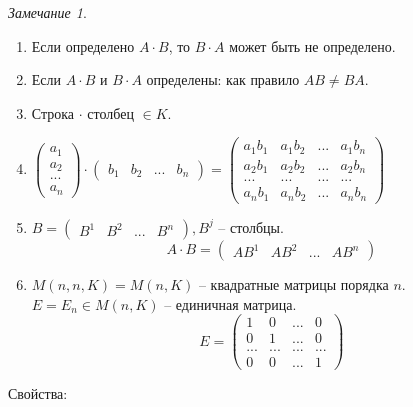 \documentclass[12pt]{article}
\newenvironment{MyList}[1][4pt]{
  \begin{enumerate}[1.]
  \setlength{\parskip}{0pt}
  \setlength{\itemsep}{#1}
}{       
  \end{enumerate}
}
\theoremstyle{definition} %
\theoremstyle{plain} %
\theoremstyle{remark} %
\newtheorem{Rem}[Thm]{Замечание} %
\begin{document}
{\begin{Rem}
    \begin{MyList}
        \item Если определено $A \cdot B$, то $B \cdot A$ может быть не определено.
        \item Если $A \cdot B$ и $B \cdot A$ определены: как правило $AB \neq BA$.
        \item Строка $\cdot$ столбец $\in K$.
        \item $\left(\begin{array}{c}
        a_1 \\ 
        a_2 \\ 
        ... \\ 
        a_n
        \end{array}\right) \cdot \left(\begin{array}{cccc}
        b_1 & b_2 & ... & b_n
        \end{array}\right) = \left(\begin{array}{cccc}
        a_1b_1 & a_1b_2 & ... & a_1b_n \\ 
        a_2b_1 & a_2b_2 & ... & a_2b_n \\ 
        ... & ... & ... & ... \\ 
        a_nb_1 & a_nb_2 & ... & a_nb_n
        \end{array}\right)$ 

        \item $B = \left(\begin{array}{cccc}
        B^1 & B^2 & ... & B^n
        \end{array}\right), B^j$ -- столбцы.
        \[A \cdot B = \left(\begin{array}{cccc}
        AB^1 & AB^2 & ... & AB^n
        \end{array}\right)\]

        \item $M(n, n, K) = M(n, K)$ -- квадратные матрицы порядка $n$. $E = E_n \in M(n, K)$ -- единичная матрица.
        \[E = \left(\begin{array}{cccc}
        1 & 0 & ... & 0 \\ 
        0 & 1 & ... & 0 \\ 
        ... & ... & ... & ... \\ 
        0 & 0 & ... & 1
        \end{array}\right)\]
    \end{MyList}
\end{Rem}

Свойства:

}
\end{document}

